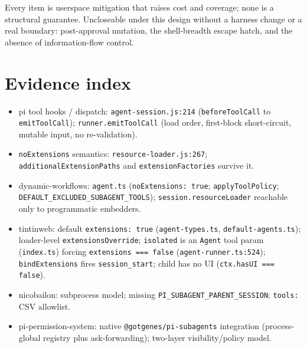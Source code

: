 \documentclass[11pt]{article}
\newcommand{\code}[1]{\texttt{#1}}
\begin{document}
Every item is userspace mitigation that raises cost and coverage; none is a
structural guarantee. Uncloseable under this design without a harness change or a
real boundary: post-approval mutation, the shell-breadth escape hatch, and the
absence of information-flow control.

\section*{Evidence index}

\begin{itemize}
  \item pi tool hooks / dispatch: \code{agent-session.js:214}
    (\code{beforeToolCall} to \code{emitToolCall}); \code{runner.emitToolCall}
    (load order, first-block short-circuit, mutable input, no re-validation).
  \item \code{noExtensions} semantics: \code{resource-loader.js:267};
    \code{additionalExtensionPaths} and \code{extensionFactories} survive it.
  \item dynamic-workflows: \code{agent.ts} (\code{noExtensions: true};
    \code{applyToolPolicy}; \code{DEFAULT\_EXCLUDED\_SUBAGENT\_TOOLS});
    \code{session.resourceLoader} reachable only to programmatic embedders.
  \item tintinweb: default \code{extensions: true} (\code{agent-types.ts},
    \code{default-agents.ts}); loader-level \code{extensionsOverride};
    \code{isolated} is an \code{Agent} tool param (\code{index.ts}) forcing
    \code{extensions === false} (\code{agent-runner.ts:524});
    \code{bindExtensions} fires \code{session\_start}; child has no UI
    (\code{ctx.hasUI === false}).
  \item nicobailon: subprocess model; missing \code{PI\_SUBAGENT\_PARENT\_SESSION};
    \code{tools:} CSV allowlist.
  \item pi-permission-system: native \code{@gotgenes/pi-subagents} integration
    (process-global registry plus ask-forwarding); two-layer visibility/policy
    model.
\end{itemize}
\end{document}

